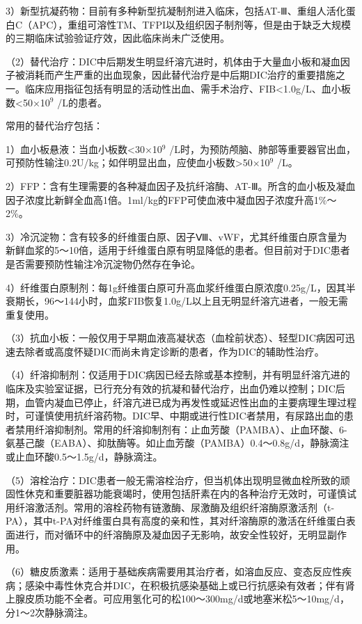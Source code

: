 3）新型抗凝药物：目前有多种新型抗凝制剂进入临床，包括AT-Ⅲ、重组人活化蛋白C（APC），重组可溶性TM、TFPI以及组织因子制剂等，但是由于缺乏大规模的三期临床试验验证疗效，因此临床尚未广泛使用。

（2）替代治疗：DIC中后期发生明显纤溶亢进时，机体由于大量血小板和凝血因子被消耗而产生严重的出血现象，因此替代治疗是中后期DIC治疗的重要措施之一。临床应用指征包括有明显的活动性出血、需手术治疗、FIB<1.0g/L、血小板数<50×10$^{9}$
/L的患者。

常用的替代治疗包括：

1）血小板悬液：当血小板数<30×10$^{9}$
/L时，为预防颅脑、肺部等重要器官出血，可预防性输注0.2U/kg；如伴明显出血，应使血小板数\textgreater{}50×10$^{9}$
/L。

2）FFP：含有生理需要的各种凝血因子及抗纤溶酶、AT-Ⅲ。所含的血小板及凝血因子浓度比新鲜全血高1倍。1ml/kg的FFP可使血液中凝血因子浓度升高1\%～2\%。

3）冷沉淀物：含有较多的纤维蛋白原、因子Ⅷ、vWF，尤其纤维蛋白原含量为新鲜血浆的5～10倍，适用于纤维蛋白原有明显降低的患者。但目前对于DIC患者是否需要预防性输注冷沉淀物仍然存在争论。

4）纤维蛋白原制剂：每1g纤维蛋白原可升高血浆纤维蛋白原浓度0.25g/L，因其半衰期长，96～144小时，血浆FIB恢复1.0g/L以上且无明显纤溶亢进者，一般无需重复使用。

（3）抗血小板：一般仅用于早期血液高凝状态（血栓前状态）、轻型DIC病因可迅速去除者或高度怀疑DIC而尚未肯定诊断的患者，作为DIC的辅助性治疗。

（4）纤溶抑制剂：仅适用于DIC病因已经去除或基本控制，并有明显纤溶亢进的临床及实验室证据，已行充分有效的抗凝和替代治疗，出血仍难以控制；DIC后期，血管内凝血已停止，纤溶亢进已成为再发性或延迟性出血的主要病理生理过程时，可谨慎使用抗纤溶药物。DIC早、中期或进行性DIC者禁用，有尿路出血的患者禁用纤溶抑制剂。常用的纤溶抑制剂有：止血芳酸（PAMBA）、止血环酸、6-氨基己酸（EABA）、抑肽酶等。如止血芳酸（PAMBA）0.4～0.8g/d，静脉滴注或止血环酸0.5～1.5g/d，静脉滴注。

（5）溶栓治疗：DIC患者一般无需溶栓治疗，但当机体出现明显微血栓所致的顽固性休克和重要脏器功能衰竭时，使用包括肝素在内的各种治疗无效时，可谨慎试用纤溶激活剂。常用的溶栓药物有链激酶、尿激酶及组织纤溶酶原激活剂（t-PA），其中t-PA对纤维蛋白具有高度的亲和性，其对纤溶酶原的激活在纤维蛋白表面进行，而对循环中的纤溶酶原及凝血因子无影响，故安全性较好，无明显副作用。

（6）糖皮质激素：适用于基础疾病需要用其治疗者，如溶血反应、变态反应性疾病；感染中毒性休克合并DIC，在积极抗感染基础上或已行抗感染有效者；伴有肾上腺皮质功能不全者。可应用氢化可的松100～300mg/d或地塞米松5～10mg/d，分1～2次静脉滴注。

